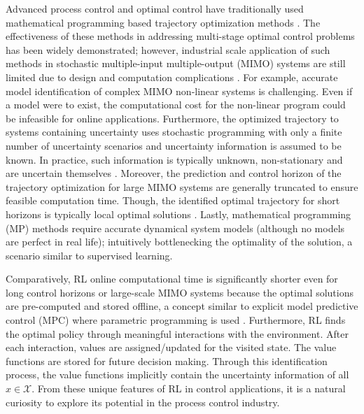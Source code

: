 %
% 
Advanced process control and optimal control have traditionally used mathematical programming based trajectory optimization methods \cite{empc2, zone_mpc, mpc, empc1,}.  The effectiveness of these methods in addressing multi-stage optimal control problems has been widely demonstrated; however, industrial scale application of such methods in stochastic multiple-input multiple-output (MIMO) systems are still limited due to design and computation complications \cite{MS}. For example, accurate model identification of complex MIMO non-linear systems is challenging. Even if a model were to exist, the computational cost for the non-linear program could be infeasible for online applications. Furthermore, the optimized trajectory to systems containing uncertainty uses stochastic programming with only a finite number of uncertainty scenarios and uncertainty information is assumed to be known. In practice, such information is typically unknown, non-stationary and are uncertain themselves \cite{jayCCE}. Moreover, the prediction and control horizon of the trajectory optimization for large MIMO systems are generally truncated to ensure feasible computation time. Though, the identified optimal trajectory for short horizons is typically local optimal solutions \cite{mpc}. Lastly, mathematical programming (MP) methods require accurate dynamical system models (although no models are perfect in real life); intuitively bottlenecking the optimality of the solution, a scenario similar to supervised learning.

Comparatively, RL online computational time is significantly shorter even for long control horizons or large-scale MIMO systems because the optimal solutions are pre-computed and stored offline, a concept similar to explicit model predictive control (MPC) where parametric programming is used \cite{explicit_MPC}. Furthermore, RL finds the optimal policy through meaningful interactions with the environment.  After each interaction, values are assigned/updated for the visited state. The value functions are stored for future decision making.  Through this identification process, the value functions implicitly contain the uncertainty information of all $x \in \mathcal{X}$. From these unique features of RL in control applications, it is a natural curiosity to explore its potential in the process control industry.


